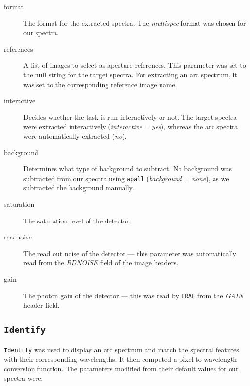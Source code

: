 \begin{description}

\item[format]
The format for the extracted spectra. The \textit{multispec} format
was chosen for our spectra. %

\item[references]
A list of images to select as aperture references. This parameter was set
to the null string for the target spectra. For extracting an arc
spectrum, it was set to the corresponding reference image name. %

\item[interactive]
Decides whether the task is run interactively or not. The target
spectra were extracted interactively (\textit{interactive} =
\textit{yes}), whereas the arc spectra were automatically extracted
(\textit{no}). %

\item[background]
Determines what type of background to subtract. No background was
subtracted from our spectra using \texttt{apall} (\textit{background} = \textit{none}), as we subtracted the background manually. %

\item[saturation]
The saturation level of the detector. %

\item[readnoise]
The read out noise of the detector --- this parameter was automatically
read from the \textit{RDNOISE} field of the image headers. %

\item[gain]
The photon gain of the detector --- this was read by \texttt{IRAF} from
the \textit{GAIN} header field. %

\end{description}



\subsection{\texttt{Identify}}\label{cha:IRAF:sec:Spectroscopy:subsec:identify}

\texttt{Identify} was used to display an arc spectrum and match the
spectral features with their corresponding wavelengths. It then
computed a pixel to wavelength conversion function. The parameters modified from their default values for our spectra were: %

